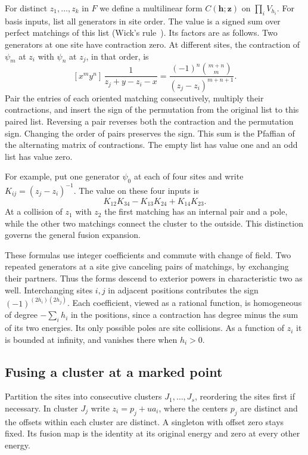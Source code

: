 For distinct $z_1,\ldots,z_k$ in $F$ we define a multilinear form
$C(\mathbf h;\mathbf z)$ on $\prod_i V_{h_i}$. For basis inputs, list all generators in site order.
The value
is a signed sum over perfect matchings of this list (Wick's
rule~\cite{wick}). Its factors are as follows. Two generators at one
site have contraction zero. At different sites, the contraction of
$\psi_m$ at $z_i$ with $\psi_n$ at $z_j$, in that order, is
\begin{equation}\label{eq:fermions-kernel}
 [x^m y^n]\,\frac{1}{z_j+y-z_i-x}
 =\frac{(-1)^n\binom{m+n}{m}}{(z_j-z_i)^{m+n+1}} .
\end{equation}
Pair the entries of each oriented matching consecutively, multiply
their contractions, and insert the sign of the permutation from
the original list to this paired list. Reversing a pair reverses both
the contraction and the permutation sign. Changing the order of pairs
preserves the sign. This sum is the Pfaffian of the alternating
matrix of contractions. The empty list has value one and an odd
list has value zero.

For example, put one generator $\psi_0$ at each of four sites
and write $K_{ij}=(z_j-z_i)^{-1}$. The value on these four inputs is
\[
 K_{12}K_{34}-K_{13}K_{24}+K_{14}K_{23}.
\]
At a collision of $z_1$ with $z_2$ the first matching has an internal
pair and a pole, while the other two matchings connect the cluster to
the outside. This distinction governs the general fusion expansion.

These formulas use integer coefficients and commute with change of field.
Two repeated generators at a site give canceling pairs of matchings, by
exchanging their partners. Thus the forms descend to exterior powers in
characteristic two as well. Interchanging sites $i,j$ in adjacent positions
contributes the sign $(-1)^{(2h_i)(2h_j)}$. Each coefficient, viewed as a rational function,
is homogeneous of degree $-\sum_i h_i$ in the positions, since a contraction
has degree minus the sum of its two energies. Its only possible poles are
site collisions. As a function of $z_i$ it is bounded at infinity, and
vanishes there when $h_i>0$.

\subsection{Fusing a cluster at a marked point}
Partition the sites into consecutive clusters $J_1,\ldots,J_s$, reordering
the sites first if necessary. In cluster $J_j$ write $z_i=p_j+u a_i$, where
the centers $p_j$ are distinct and the offsets within each cluster are
distinct. A singleton with offset zero stays fixed. Its fusion map is the
identity at its original energy and zero at every other energy.

